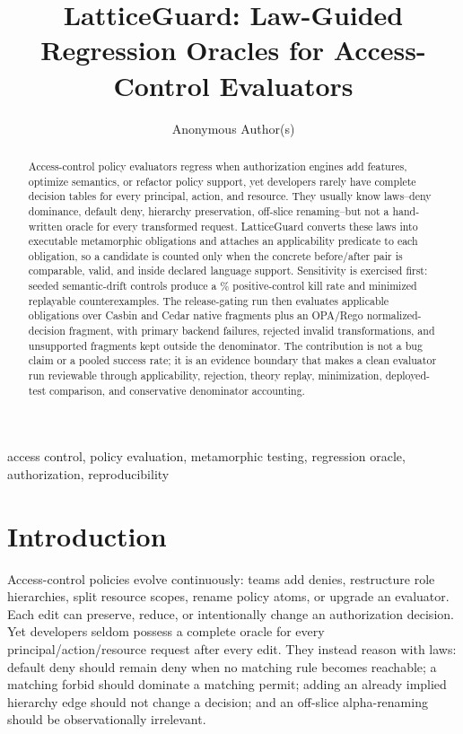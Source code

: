\documentclass[10pt,conference]{IEEEtran}
\title{LatticeGuard: Law-Guided Regression Oracles for Access-Control Evaluators}
\author{Anonymous Author(s)}
\begin{document}
\maketitle

\begin{abstract}
Access-control policy evaluators regress when authorization engines add features, optimize semantics, or refactor policy support, yet developers rarely have complete decision tables for every principal, action, and resource.  They usually know laws--deny dominance, default deny, hierarchy preservation, off-slice renaming--but not a hand-written oracle for every transformed request.  LatticeGuard converts these laws into executable metamorphic obligations and attaches an applicability predicate to each obligation, so a candidate is counted only when the concrete before/after pair is comparable, valid, and inside declared language support.  Sensitivity is exercised first: \LGSeededRows{} seeded semantic-drift controls produce a \LGSeededKillRate{}\% positive-control kill rate and \LGCounterexamples{} minimized replayable counterexamples.  The release-gating run then evaluates \LGPrimaryObligations{} applicable obligations over Casbin and Cedar native fragments plus an OPA/Rego normalized-decision fragment, with \LGPrimaryFailures{} primary backend failures, \LGRejected{} rejected invalid transformations, and \LGUnsupported{} unsupported fragments kept outside the denominator.  The contribution is not a bug claim or a pooled success rate; it is an evidence boundary that makes a clean evaluator run reviewable through applicability, rejection, theory replay, minimization, deployed-test comparison, and conservative denominator accounting.
\end{abstract}

\begin{IEEEkeywords}
access control, policy evaluation, metamorphic testing, regression oracle, authorization, reproducibility
\end{IEEEkeywords}

\section{Introduction}
Access-control policies evolve continuously: teams add denies, restructure role hierarchies, split resource scopes, rename policy atoms, or upgrade an evaluator.  Each edit can preserve, reduce, or intentionally change an authorization decision.  Yet developers seldom possess a complete oracle for every principal/action/resource request after every edit.  They instead reason with laws: default deny should remain deny when no matching rule becomes reachable; a matching forbid should dominate a matching permit; adding an already implied hierarchy edge should not change a decision; and an off-slice alpha-renaming should be observationally irrelevant.
\end{document}
